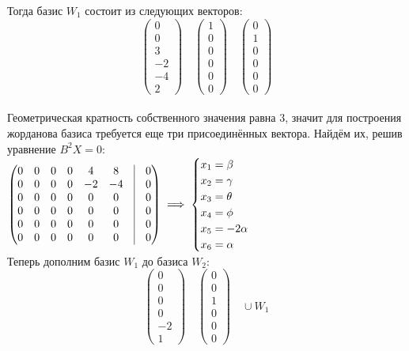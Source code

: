 \noindent Тогда базис $W_1$ состоит из следующих векторов: \\
\[
\begin{pmatrix}
0 \\ 0 \\ 3 \\ -2 \\ -4 \\ 2
\end{pmatrix}
\quad
\begin{pmatrix}
1 \\ 0 \\ 0 \\ 0 \\ 0 \\ 0
\end{pmatrix}
\quad
\begin{pmatrix}
0 \\ 1 \\ 0 \\ 0 \\ 0 \\ 0
\end{pmatrix}
\] \\
Геометрическая кратность собственного значения равна 3,
значит для построения жорданова базиса требуется еще три присоединённых вектора. Найдём их, решив уравнение $B^2X = 0$: \\
\noindent \(\displaystyle
\begin{pmatrix}
0 &   0 &  0 &  0 &  4 &  8 & \vline & 0\\
 0 &  0 & 0 &  0 & -2 & -4 & \vline & 0 \\
 0 &   0 & 0 &  0 &  0 &  0 & \vline & 0\\
 0 &   0 &  0 & 0 &  0 &  0 & \vline & 0\\
 0 &   0 &  0 &  0 & 0 &  0 & \vline & 0\\
 0 &   0 &  0 &  0 &  0 & 0 & \vline & 0
\end{pmatrix}
\implies 
\begin{cases}
x_1 = \beta \\
x_2 = \gamma \\
x_3 = \theta \\
x_4 = \phi \\
x_5 = -2\alpha \\
x_6 =\alpha
\end{cases}
\) \\

\noindent Теперь дополним базис $W_1$ до базиса $W_2$:
\[
\begin{pmatrix}
0 \\ 0 \\ 0 \\ 0 \\ -2 \\ 1
\end{pmatrix}
\quad
\begin{pmatrix}
0 \\ 0 \\ 1 \\ 0 \\ 0 \\ 0
\end{pmatrix}
\quad
\cup W_1
\] \\

